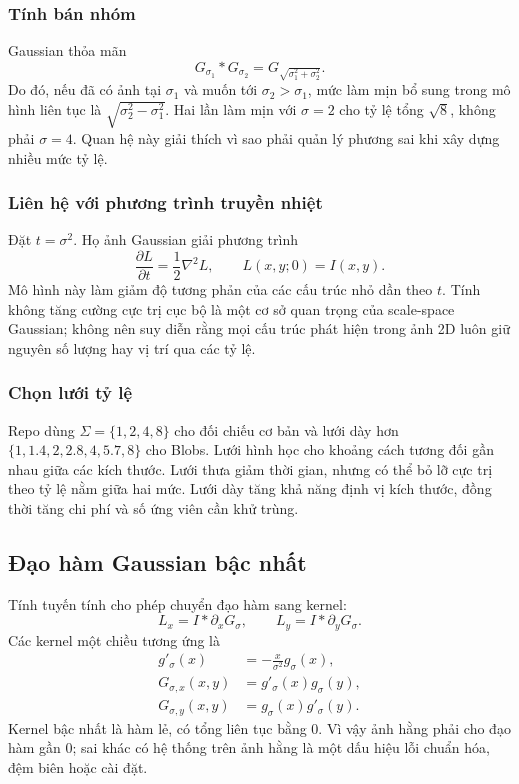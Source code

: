\subsubsection{Tính bán nhóm}
Gaussian thỏa mãn
\begin{equation}
G_{\sigma_1}*G_{\sigma_2}
=G_{\sqrt{\sigma_1^2+\sigma_2^2}}.
\end{equation}
Do đó, nếu đã có ảnh tại $\sigma_1$ và muốn tới $\sigma_2>\sigma_1$, mức làm mịn bổ sung trong mô hình liên tục là $\sqrt{\sigma_2^2-\sigma_1^2}$. Hai lần làm mịn với $\sigma=2$ cho tỷ lệ tổng $\sqrt8$, không phải $\sigma=4$. Quan hệ này giải thích vì sao phải quản lý phương sai khi xây dựng nhiều mức tỷ lệ.

\subsubsection{Liên hệ với phương trình truyền nhiệt}
Đặt $t=\sigma^2$. Họ ảnh Gaussian giải phương trình
\begin{equation}
\frac{\partial L}{\partial t}=\frac12\nabla^2L,\qquad L(x,y;0)=I(x,y).
\end{equation}
Mô hình này làm giảm độ tương phản của các cấu trúc nhỏ dần theo $t$. Tính không tăng cường cực trị cục bộ là một cơ sở quan trọng của scale-space Gaussian; không nên suy diễn rằng mọi cấu trúc phát hiện trong ảnh 2D luôn giữ nguyên số lượng hay vị trí qua các tỷ lệ.

\subsubsection{Chọn lưới tỷ lệ}
Repo dùng $\Sigma=\{1,2,4,8\}$ cho đối chiếu cơ bản và lưới dày hơn $\{1,1.4,2,2.8,4,5.7,8\}$ cho Blobs. Lưới hình học cho khoảng cách tương đối gần nhau giữa các kích thước. Lưới thưa giảm thời gian, nhưng có thể bỏ lỡ cực trị theo tỷ lệ nằm giữa hai mức. Lưới dày tăng khả năng định vị kích thước, đồng thời tăng chi phí và số ứng viên cần khử trùng.

\subsection{Đạo hàm Gaussian bậc nhất}
Tính tuyến tính cho phép chuyển đạo hàm sang kernel:
\begin{equation}
L_x=I*\partial_xG_\sigma,\qquad L_y=I*\partial_yG_\sigma.
\end{equation}
Các kernel một chiều tương ứng là
\begin{align}
g'_\sigma(x)&=-\frac{x}{\sigma^2}g_\sigma(x),\\
G_{\sigma,x}(x,y)&=g'_\sigma(x)g_\sigma(y),\\
G_{\sigma,y}(x,y)&=g_\sigma(x)g'_\sigma(y).
\end{align}
Kernel bậc nhất là hàm lẻ, có tổng liên tục bằng 0. Vì vậy ảnh hằng phải cho đạo hàm gần 0; sai khác có hệ thống trên ảnh hằng là một dấu hiệu lỗi chuẩn hóa, đệm biên hoặc cài đặt.

